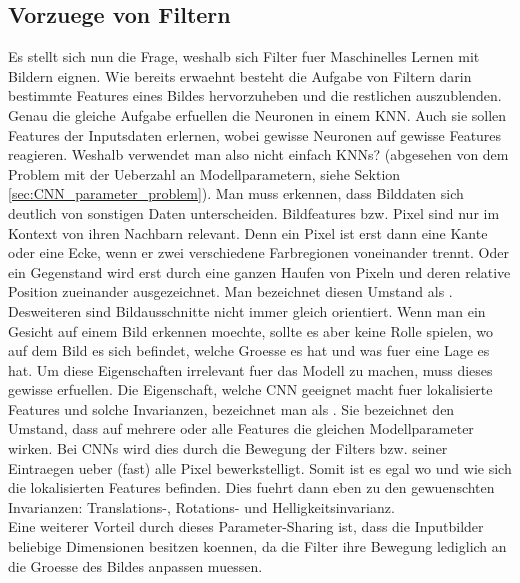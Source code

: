 \subsection{Vorzuege von Filtern}
Es stellt sich nun die Frage, weshalb sich Filter fuer Maschinelles
Lernen mit Bildern eignen.
Wie bereits erwaehnt besteht die Aufgabe von Filtern darin bestimmte Features
eines Bildes hervorzuheben und die restlichen auszublenden. Genau die gleiche
Aufgabe erfuellen die Neuronen in einem KNN. Auch sie sollen Features der
Inputsdaten erlernen, wobei gewisse Neuronen auf gewisse Features reagieren.
Weshalb verwendet man also nicht einfach KNNs? (abgesehen
von dem Problem mit der Ueberzahl an Modellparametern, siehe Sektion \ref{sec:CNN_parameter_problem}).
\para{}
Man muss erkennen, dass Bilddaten sich deutlich von sonstigen Daten unterscheiden.
Bildfeatures bzw. Pixel sind nur im Kontext von ihren Nachbarn relevant. Denn
ein Pixel ist erst dann eine Kante oder eine Ecke, wenn er zwei verschiedene
Farbregionen voneinander trennt. Oder ein Gegenstand wird erst durch eine ganzen Haufen
von Pixeln und deren relative Position zueinander ausgezeichnet.
Man bezeichnet diesen Umstand als .
\para{}
Desweiteren sind Bildausschnitte nicht immer gleich
orientiert. Wenn man ein Gesicht auf einem Bild erkennen moechte, sollte es aber
keine Rolle spielen, wo auf dem Bild es sich befindet, welche Groesse es
hat und was fuer eine Lage es hat. Um diese Eigenschaften irrelevant fuer das
Modell zu machen, muss dieses gewisse  erfuellen.
\para{}
Die Eigenschaft, welche CNN geeignet macht fuer lokalisierte Features und
solche Invarianzen, bezeichnet man als .
Sie bezeichnet den Umstand, dass auf
mehrere oder alle Features die gleichen Modellparameter wirken. Bei CNNs wird
dies durch die Bewegung der Filters bzw. seiner Eintraegen ueber (fast) alle
Pixel bewerkstelligt. Somit ist
es egal wo und wie sich die lokalisierten Features befinden. Dies fuehrt dann eben zu
den gewuenschten Invarianzen: Translations-, Rotations- und
Helligkeitsinvarianz. \\
Eine weiterer Vorteil durch dieses Parameter-Sharing ist, dass die Inputbilder
beliebige Dimensionen besitzen koennen, da die Filter ihre Bewegung lediglich an
die Groesse des Bildes anpassen muessen.

